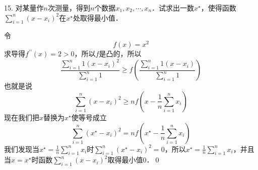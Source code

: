 15. 对某量作$n$次测量，得到$n$个数据$x_1,x_2,\cdots, x_n$．试求出一数$x^\star$，使得函数$\displaystyle\sum_{i=1}^n \left(x- x_i\right)^2$在$x^\star$处取得最小值．

\solve 令
\begin{equation}
    f(x) = x^2
\end{equation}
求导得$f^{\prime\prime}(x)=2>0$，所以$f$是凸的，所以
\begin{equation}
    \frac{\displaystyle\sum_{i=1}^n 1 \left(x-x_i\right)^2}{\displaystyle\sum_{i=1}^n 1} \geq f \left(\displaystyle\frac{\displaystyle\sum_{i=1}^n 1 \left(x-x_i\right)}{\displaystyle\sum_{i=1}^n 1}\right)
\end{equation}
也就是说
\begin{equation}
    \sum_{i=1}^n \left( x - x_i\right)^2 \geq n f(x - \frac{1}{n}\displaystyle\sum_{i=1}^n x_i)
\end{equation}
现在我们把$x$替换为$x^\star$使等号成立
\begin{equation}
    \sum_{i=1}^n \left(x^\star - x_i\right)^2 = n f \left(x^\star - \frac{1}{n} \displaystyle\sum_{i=1}^n x_i\right)
\end{equation}
我们发现当$x^\star = \displaystyle\frac{1}{n} \sum_{i=1}^n x_i$时$\displaystyle\sum_{i=1}^n \left(x^\star - x_i\right)^2 = 0$，所以$x^\star = \displaystyle\frac{1}{n} \displaystyle\sum_{i=1}^n x_i$，并且当$x = x^\star$时函数$\displaystyle\sum_{i=1}^n \left(x - x_i\right)^2$取得最小值$0$．\qed\bigskip
